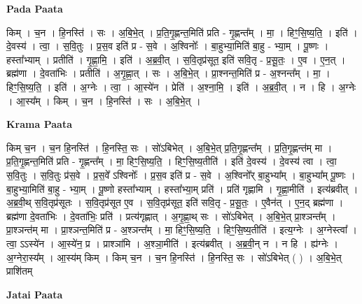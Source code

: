 \documentclass[17pt]{extarticle}
\begin{document}
\textbf{Pada Paata} \newline

किम् । च॒न । हि॒नस्ति॑ । सः । अ॒बि॒भे॒त् । प्र॒ति॒गृ॒ह्णन्त॒मिति॑ प्रति - गृ॒ह्णन्त᳚म् । मा॒ । हिꣳ॒॒सि॒ष्य॒ति॒ । इति॑ । दे॒वस्य॑ । त्वा॒ । स॒वि॒तुः । प्र॒स॒व इति॑ प्र - स॒वे । अ॒श्विनोः᳚ । बा॒हुभ्या॒मिति॑ बा॒हु - भ्या॒म् । पू॒ष्णः । हस्ता᳚भ्याम् । प्रतीति॑ । गृ॒ह्णा॒मि॒ । इति॑ । अ॒ब्र॒वी॒त् । स॒वि॒तृप्र॑सूत॒ इति॑ सवि॒तृ - प्र॒सू॒तः॒ । ए॒व । ए॒न॒त् । ब्रह्म॑णा । दे॒वता॑भिः । प्रतीति॑ । अ॒गृ॒ह्णा॒त् । सः । अ॒बि॒भे॒त् । प्रा॒श्नन्त॒मिति॑ प्र - अ॒श्नन्त᳚म् । मा॒ । हिꣳ॒॒सि॒ष्य॒ति॒ । इति॑ । अ॒ग्नेः । त्वा॒ । आ॒स्ये॑न । प्रेति॑ । अ॒श्ना॒मि॒ । इति॑ । अ॒ब्र॒वी॒त् । न । हि । अ॒ग्नेः । आ॒स्य᳚म् । किम् । च॒न । हि॒नस्ति॑ । सः । अ॒बि॒भे॒त् ।  \newline


\textbf{Krama Paata} \newline

किम् च॒न । च॒न हि॒नस्ति॑ । हि॒नस्ति॒ सः । सो॑ऽबिभेत् । अ॒बि॒भे॒त् प्र॒ति॒गृ॒ह्णन्त᳚म् । प्र॒ति॒गृ॒ह्णन्त॑म् मा । प्र॒ति॒गृ॒ह्णन्त॒मिति॑ प्रति - गृ॒ह्णन्त᳚म् । मा॒ हिꣳ॒॒सि॒ष्य॒ति॒ । हिꣳ॒॒सि॒ष्य॒तीति॑ । इति॑ दे॒वस्य॑ । दे॒वस्य॑ त्वा । त्वा॒ स॒वि॒तुः । स॒वि॒तुः प्र॑स॒वे । प्र॒स॒वे᳚ ऽश्विनोः᳚ । प्र॒स॒व इति॑ प्र - स॒वे । अ॒श्विनो᳚र् बा॒हुभ्या᳚म् । बा॒हुभ्या᳚म् पू॒ष्णः । बा॒हुभ्या॒मिति॑ बा॒हु - भ्या॒म् । पू॒ष्णो हस्ता᳚भ्याम् । हस्ता᳚भ्या॒म् प्रति॑ । प्रति॑ गृह्णामि । गृ॒ह्णा॒मीति॑ । इत्य॑ब्रवीत् । अ॒ब्र॒वी॒थ् स॒वि॒तृप्र॑सूतः । स॒वि॒तृप्र॑सूत ए॒व । स॒वि॒तृप्र॑सूत॒ इति॑ सवि॒तृ - प्र॒सू॒तः॒ । ए॒वैन॑त् । ए॒न॒द् ब्रह्म॑णा । ब्रह्म॑णा दे॒वता॑भिः । दे॒वता॑भिः॒ प्रति॑ । प्रत्य॑गृह्णात् । अ॒गृ॒ह्णा॒थ् सः । सो॑ऽबिभेत् । अ॒बि॒भे॒त् प्रा॒श्ञन्त᳚म् । प्रा॒श्ञन्त॑म् मा । प्रा॒श्ञन्त॒मिति॑ प्र - अ॒श्ञन्त᳚म् । मा॒ हिꣳ॒॒सि॒ष्य॒ति॒ । हिꣳ॒॒सि॒ष्य॒तीति॑ । इत्य॒ग्नेः । अ॒ग्नेस्त्वा᳚ । त्वा॒ ऽऽस्ये॑न । आ॒स्ये॑न॒ प्र । प्राश्ञा॑मि । अ॒श्ञा॒मीति॑ । इत्य॑ब्रवीत् । अ॒ब्र॒वी॒न् न । न हि । ह्य॑ग्नेः । अ॒ग्नेरा॒स्य᳚म् । आ॒स्य॑म् किम् । किम् च॒न । च॒न हि॒नस्ति॑ । हि॒नस्ति॒ सः । सो॑ऽबिभेत् ( ) । अ॒बि॒भे॒त् प्राशि॑तम् \newline

\textbf{Jatai Paata} \newline
\end{document}
